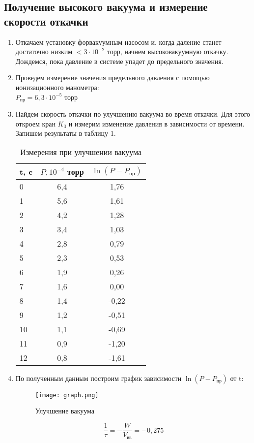 \documentclass[a4paper,12pt]{article}
\theoremstyle{plain} %
\theoremstyle{definition} %
\theoremstyle{remark} %
\begin{document}
\subsection{Получение высокого вакуума и измерение скорости откачки}
\begin{enumerate}
\item
Откачаем установку форвакуумным насосом и, когда даление станет достаточно низким $< 3\cdot 10^{-2}$ торр, начнем высоковакуумную откачку. Дождемся, пока давление в системе упадет до предельного значения.
\item
Проведем измерение значения предельного давления с помощью ионизационного манометра: \\
$P_\textit{пр} = 6,3 \cdot 10^{-5}$ торр
\item
Найдем скорость откачки по улучшению вакуума во время откачки. Для этого откроем кран $K_3$ и измерим изменение давления в зависимости от времени. Запишем результаты в таблицу 1.
\begin{table}[!h]
\centering
\begin{tabular}{|l|c|c|}
\toprule
 t, c & $P, 10^{-4}$ торр & $\ln (P - P_\textit{пр})$  \\
\midrule
0   &   6,4 &   1,76 \\
1   &   5,6 &   1,61 \\
2   &   4,2 &   1,28 \\
3   &   3,4 &   1,03 \\
4   &   2,8 &   0,79 \\
5   &   2,3 &   0,53 \\
6   &   1,9 &   0,26 \\
7   &   1,6 &   0,00 \\
8   &   1,4 &   -0,22 \\
9   &   1,2 &   -0,51 \\
10  &   1,1 &   -0,69 \\
11  &   0,9 &   -1,20 \\
12  &   0,8 &   -1,61 \\
\bottomrule
\end{tabular}
\caption{Измерения при улучшении вакуума}
\end{table}
\item
По полученным данным построим график зависимости  $\ln (P - P_\textit{пр}) $ от t:
\begin{figure}[!h]
\centering
\texttt{[image: graph.png]} 
\caption{Улучшение вакуума}
\end{figure}
\[\dfrac{1}{\tau} = -\dfrac{W}{V_\textit{вв}} = -0,275\]

\end{enumerate}
\end{document}

